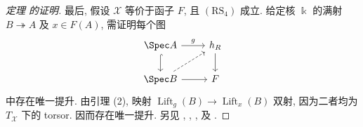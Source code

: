 \begin{proof}[定理  的证明]
最后, 假设 $\mathcal X$ 等价于函子 $F$, 且 $(\mathrm{RS}_4)$ 成立. 给定核 $\Bbbk$ 的满射 $B\twoheadrightarrow A$ 及 $x\in F(A)$, 需证明每个图
\[
\begin{tikzcd}
\Spec A\arrow[r,"g"]\arrow[d,hook]&h_R\arrow[d]\\
\Spec B\arrow[r]\arrow[ur,dashed]&F
\end{tikzcd}
\]
中存在唯一提升. 由引理 (2), 映射 $\operatorname{Lift}_g(B)\to\operatorname{Lift}_x(B)$ 双射, 因为二者均为 $T_{\mathcal X}$ 下的 torsor. 因而存在唯一提升. 另见 \cite[定理 $2.11$]{Sch68}, \cite[定理 VI.$1.11$]{SGA7-I}, \cite[定理 $16.2$]{Har10}, \cite[定理 $2.3.2$]{Ser06} 及 \cite[Tag 06IX]{SP}.
\end{proof}

